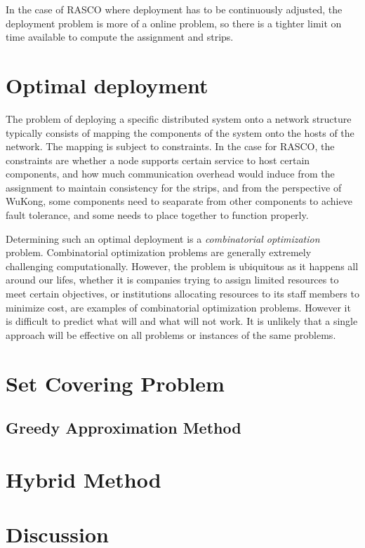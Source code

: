 In the case of RASCO where deployment has to be continuously adjusted, the
deployment problem is more of a online problem, so there is a tighter limit on
time available to compute the assignment and strips.

\section{Optimal deployment}

The problem of deploying a specific distributed system onto a network structure
typically consists of mapping the components of the system onto the hosts of
the network. The mapping is subject to constraints. In the case for RASCO, the
constraints are whether a node supports certain service to host certain
components, and how much communication overhead would induce from the
assignment to maintain consistency for the strips, and from the perspective of
WuKong, some components need to seaparate from other components to achieve
fault tolerance, and some needs to place together to function properly.

Determining such an optimal deployment is a \emph{combinatorial optimization}
problem. Combinatorial optimization problems are generally extremely
challenging computationally. However, the problem is ubiquitous as it happens
all around our lifes, whether it is companies trying to assign limited
resources to meet certain objectives, or institutions allocating resources to
its staff members to minimize cost, are examples of combinatorial optimization
problems. However it is difficult to predict what will and what will not work.
It is unlikely that a single approach will be effective on all problems or
instances of the same problems.

\section{Set Covering Problem}


\subsection{Greedy Approximation Method}

\section{Hybrid Method}

\section{Discussion}
